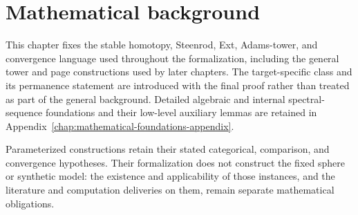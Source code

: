 \chapter{Mathematical background}
\label{chap:mathematical-setting}

This chapter fixes the stable homotopy, Steenrod, Ext, Adams-tower, and
convergence language used throughout the formalization, including the general
tower and page constructions used by later chapters. The target-specific
class and its permanence statement are introduced with the final proof rather
than treated as part of the general background. Detailed algebraic and
internal spectral-sequence foundations and their low-level auxiliary lemmas are retained
in Appendix~\ref{chap:mathematical-foundations-appendix}.

Parameterized constructions retain their stated categorical, comparison, and
convergence hypotheses. Their formalization does not construct the fixed
sphere or synthetic model: the existence and applicability of those instances,
and the literature and computation deliveries on them, remain separate
mathematical obligations.

